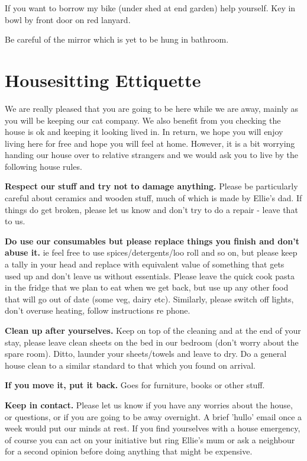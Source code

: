 \documentclass[11pt]{article}
\begin{document}
If you want to borrow my bike (under shed at end garden) help yourself.  Key in bowl by front door on red lanyard.

Be careful of the mirror which is yet to be hung in bathroom.


\newpage
\section{Housesitting Ettiquette}
We are really pleased that you are going to be here while we are away, mainly as you will be keeping our cat company. We also benefit from you checking the house is ok and keeping it looking lived in.  In return, we hope you will enjoy living here for free and hope you will feel at home.  However, it is a bit worrying handing our house over to relative strangers and we would ask you to live by the following house rules.

\textbf{Respect our stuff and try not to damage anything.}  Please be particularly careful about ceramics and wooden stuff, much of which is made by Ellie's dad.  If things do get broken, please let us know and don't try to do a repair - leave that to us.  

\textbf{Do use our consumables but please replace things you finish and don't abuse it.}  ie feel free to use spices/detergents/loo roll and so on, but please keep a tally in your head and replace with equivalent value of something that gets used up and don't leave us without essentials.  Please leave the quick cook pasta in the fridge that we plan to eat when we get back, but use up any other food that will go out of date (some veg, dairy etc).  Similarly, please switch off lights, don't overuse heating, follow instructions re phone.  

\textbf{Clean up after yourselves.} Keep on top of the cleaning and at the end of your stay, please leave clean sheets on the bed in our bedroom (don't worry about the spare room).  Ditto, launder your sheets/towels and leave to dry.  Do a general house clean to a similar standard to that which you found on arrival.  

\textbf{If you move it, put it back.}  Goes for furniture, books or other stuff.  

\textbf{Keep in contact.} Please let us know if you have any worries about the house, or questions, or if you are going to be away overnight.  A brief 'hullo' email once a week would put our minds at rest.  If you find yourselves with a house emergency, of course you can act on your initiative but ring Ellie's mum or ask a neighbour for a second opinion before doing anything that might be expensive. 
\end{document}
